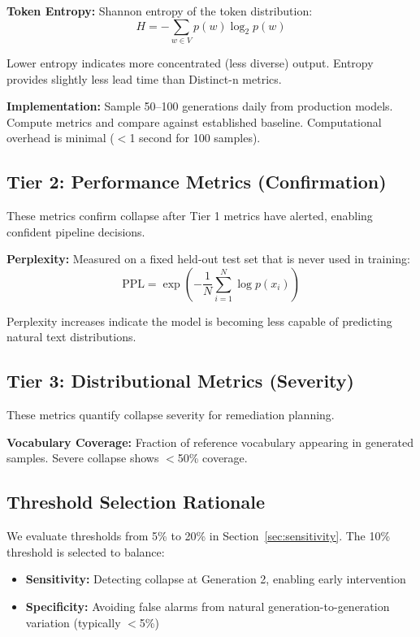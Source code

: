 \documentclass[conference]{IEEEtran}
\begin{document}
\textbf{Token Entropy:} Shannon entropy of the token distribution:
\begin{equation}
H = -\sum_{w \in V} p(w) \log_2 p(w)
\end{equation}

Lower entropy indicates more concentrated (less diverse) output. Entropy provides slightly less lead time than Distinct-n metrics.

\textbf{Implementation:} Sample 50--100 generations daily from production models. Compute metrics and compare against established baseline. Computational overhead is minimal ($<$1 second for 100 samples).

\subsection{Tier 2: Performance Metrics (Confirmation)}

These metrics confirm collapse after Tier 1 metrics have alerted, enabling confident pipeline decisions.

\textbf{Perplexity:} Measured on a fixed held-out test set that is never used in training:
\begin{equation}
\text{PPL} = \exp\left(-\frac{1}{N}\sum_{i=1}^{N} \log p(x_i)\right)
\end{equation}

Perplexity increases indicate the model is becoming less capable of predicting natural text distributions.

\subsection{Tier 3: Distributional Metrics (Severity)}

These metrics quantify collapse severity for remediation planning.

\textbf{Vocabulary Coverage:} Fraction of reference vocabulary appearing in generated samples. Severe collapse shows $<$50\% coverage.

\subsection{Threshold Selection Rationale}

We evaluate thresholds from 5\% to 20\% in Section~\ref{sec:sensitivity}. The 10\% threshold is selected to balance:
\begin{itemize}
    \item \textbf{Sensitivity:} Detecting collapse at Generation 2, enabling early intervention
    \item \textbf{Specificity:} Avoiding false alarms from natural generation-to-generation variation (typically $<$5\%)
\end{itemize}
\end{document}
